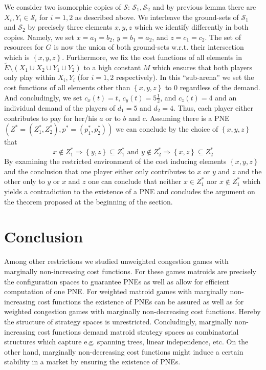 \documentclass{scrartcl}
\theoremstyle{nonumberplain}
\newcommand{\tupel}[1]{\left(#1\right)}
\newcommand{\set}[1]{\left\{#1\right\}}
\begin{document}
We consider two isomorphic copies of $\mathcal{S}$:
$\mathcal{S}_{1},\mathcal{S}_{2}$ and by previous lemma there are
$X_{i}, Y_{i}\in\mathcal{S}_{i}$ for $i = 1,2$ as described above. We
interleave the ground-sets of $\mathcal{S}_{1}$ and $\mathcal{S}_{2}$ by
precisely three elements $x,y,z$ which we identify differently in both copies.
Namely, we set $x = a_{1} = b_{2}$, $y = b_{1} = a_{2}$, and
$z = c_{1} = c_{2}$. The set of resources for $G$ is now the union of both
ground-sets w.r.t. their intersection which is $\set{x,y,z}$. Furthermore, we
fix the cost functions of all elements in
$\tilde{E}\setminus(X_{1}\cup X_{2}\cup Y_{1}\cup Y_{2})$ to a high constant
$M$ which ensures that both players only play within $X_{i},
Y_{i}$ (for $i = 1,2$ respectively). In this \enquote{sub-arena} we set the
cost functions of all elements other than $\set{x,y,z}$ to $0$ regardless of
the demand. And concludingly, we set $c_{x}(t) = t$, $c_{y}(t) = 5\frac{1}{2}$,
and $c_{z}(t) = 4$ and an individual demand of the players of $d_{1} = 5$ and
$d_{2} = 4$. Thus, each player either contributes to pay for her/his $a$ or
to $b$ and $c$. Assuming there is a PNE
$\tupel{Z^{\ast} = \tupel{Z_{1}^{\ast}, Z_{2}^{\ast}},
p^{\ast} = \tupel{p_{1}^{\ast}, p_{2}^{\ast}}}$ we can conclude by the choice
of $\set{x,y,z}$ that
\begin{equation*}
  x\notin Z_{1}^{\ast}\Rightarrow \set{y,z}\subseteq Z_{1}^{\ast} \text{ and }
  y\notin Z_{2}^{\ast}\Rightarrow \set{x,z}\subseteq Z_{2}^{\ast}
\end{equation*}
By examining the restricted environment of the cost inducing elements
$\set{x,y,z}$ and the conclusion that one player either only contributes to $x$
or $y$ and $z$ and the other only to $y$ or $x$ and $z$ one can conclude that
neither $x\in Z_{1}^{\ast}$ nor $x\notin Z_{1}^{\ast}$ which yields a
contradiction to the existence of a PNE and concludes the argument on the
theorem proposed at the beginning of the section.

\section{Conclusion}
Among other restrictions we studied unweighted congestion games with marginally
non-increasing cost functions. For these games matroids are precisely the
configuration spaces to guarantee PNEs as well as allow for efficient
computation of one PNE. For weighted matroid games with marginally
non-increasing cost functions the existence of PNEs can be assured as well as
for weighted congestion games with marginally non-decreasing cost functions.
Hereby the structure of strategy spaces is unrestricted.
Concludingly, marginally non-increasing cost functions demand matroid strategy
spaces as combinatorial structures which capture e.g. spanning trees, linear
independence, etc. On the other hand, marginally non-decreasing cost functions
might induce a certain stability in a market by ensuring the existence of PNEs.

\printbibliography

\todos
\end{document}
